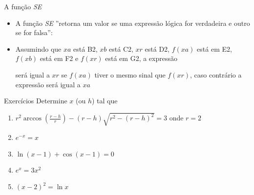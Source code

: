 \begin{frame}{A função \textit{SE}}
    \begin{itemize}
        \item A função \textit{SE} ''retorna um valor se uma expressão lógica for verdadeira e outro se for falsa'':
            \begin{center}
                \vspace{1em}
            \end{center}
        \item Assumindo que \(xa\) está B2, \(xb\) está C2, \(xr\) está D2, \(f(xa)\) está em E2, \(f(xb)\) está em F2 e \(f(xr)\) está em G2, a expressão
            \begin{center}
                \vspace{1em}
            \end{center}
            será igual a \(xr\) se \(f(xa)\) tiver o mesmo sinal que \(f(xr)\), caso contrário a expressão será igual a \(xa\)
    \end{itemize}
\end{frame}

\begin{frame}{Exercícios}
    Determine \(x\) (ou \(h\)) tal que
    \begin{enumerate}
        \item \(r^2 \arccos{\left(\frac{r-h}{r}\right)}-(r-h)\sqrt{r^2-(r-h)^2}=3\) onde \(r=2\)
        \item \(e^{-x}=x\)
        \item \(\ln(x-1) + \cos(x-1)=0 \)
        \item \(e^x=3x^2\)
        \item \((x-2)^2=\ln x\)
    \end{enumerate}
\end{frame}
